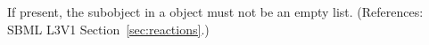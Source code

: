 If present, the \ListOfLocalParameters subobject in a \KineticLaw object
must not be an empty list.  (References: SBML L3V1
Section~\ref{sec:reactions}.)
